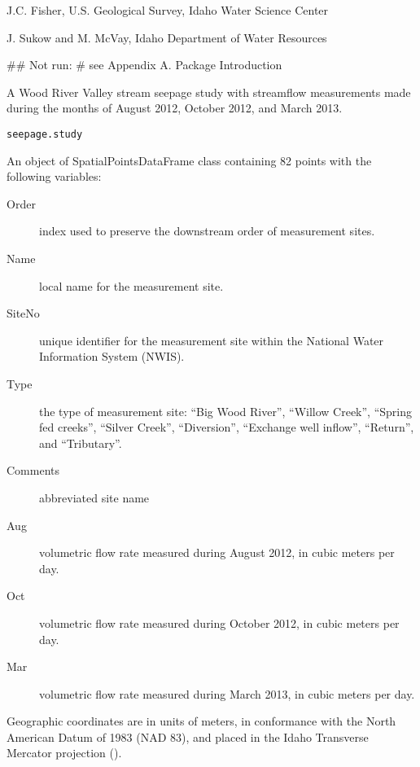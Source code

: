 \documentclass[a4paper]{book}
\begin{document}
%
\begin{Author}\relax
J.C. Fisher, U.S. Geological Survey, Idaho Water Science Center

J. Sukow and M. McVay, Idaho Department of Water Resources
\end{Author}
%
\begin{SeeAlso}\relax
{}
\end{SeeAlso}
%
\begin{Examples}
\begin{ExampleCode}
## Not run: # see Appendix A. Package Introduction

\end{ExampleCode}
\end{Examples}
%
\begin{Description}\relax
A Wood River Valley stream seepage study with streamflow measurements made during
the months of August 2012, October 2012, and March 2013.
\end{Description}
%
\begin{Usage}
\begin{verbatim}
seepage.study
\end{verbatim}
\end{Usage}
%
\begin{Format}
An object of SpatialPointsDataFrame class containing 82 points
with the following variables:
\begin{description}

\item[Order] index used to preserve the downstream order of measurement sites.
\item[Name] local name for the measurement site.
\item[SiteNo] unique identifier for the measurement site within the
National Water Information System (NWIS).
\item[Type] the type of measurement site:
``Big Wood River'', ``Willow Creek'', ``Spring fed creeks'',
``Silver Creek'', ``Diversion'', ``Exchange well inflow'',
``Return'', and ``Tributary''.
\item[Comments] abbreviated site name
\item[Aug] volumetric flow rate measured during August 2012, in cubic meters per day.
\item[Oct] volumetric flow rate measured during October 2012, in cubic meters per day.
\item[Mar] volumetric flow rate measured during March 2013, in cubic meters per day.

\end{description}

Geographic coordinates are in units of meters, in conformance with the
North American Datum of 1983 (NAD 83), and placed in the
Idaho Transverse Mercator projection ().
\end{Format}
\end{document}
